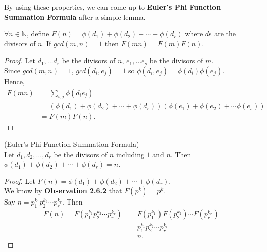 \noindent
By using these properties, we can come up to \textbf{Euler's Phi Function Summation Formula} after a simple lemma.

\begin{lemma}
$\forall n\in \mathbb{N}$, define $F(n) = \phi(d_{1}) + \phi(d_{2}) + \cdots + \phi(d_{r})$ where $d$s are the divisors of $n$. If $gcd(m, n) = 1$ then $F(mn) = F(m)F(n)$.
\end{lemma}

\begin{proof}
Let $d_{1},\dots d_{r}$ be the divisors of $n$, $e_{1},\dots e_{s}$ be the divisors of $m$. \\
Since $gcd(m, n) = 1$, $gcd(d_{i}, e_{j}) = 1$ so $\phi(d_{i}, e_{j}) = \phi(d_{i})\phi(e_{j})$. \\
Hence, 
\begin{align*}
  F(mn) &= \sum_{i, j} \phi(d_{i}e_{j}) \\
  &= (\phi(d_{1}) + \phi(d_{2}) + \cdots + \phi(d_{r}))(\phi(e_{1}) + \phi(e_{2}) + \cdots \phi(e_{s})) \\
  &= F(m)F(n).
\end{align*}
\end{proof}

\begin{theorem}
  (Euler's Phi Function Summation Formula) \\
  Let $d_{1}, d_{2},\dots, d_{r}$ be the divisors of $n$ including $1$ and $n$. Then $\phi(d_{1}) + \phi(d_{2}) + \cdots + \phi(d_{r}) = n$.
\end{theorem}

\begin{proof}
  Let $F(n) = \phi(d_{1}) + \phi(d_{2}) + \cdots + \phi(d_{r})$. \\
  We know by \textbf{Observation 2.6.2} that $F(p^{k}) = p^{k}$. \\
  Say $n = p_{1}^{k_{1}}p_{2}^{k_{2}}\cdots p_{r}^{k_{r}}$. Then 
  \begin{align*}
    F(n) = F(p_{1}^{k_{1}}p_{2}^{k_{2}}\cdots p_{r}^{k_{r}}) &= F(p_{1}^{k_{1}})F(p_{2}^{k_{2}})\cdots F(p_{r}^{k_{r}}) \\
    &= p_{1}^{k_{1}}p_{2}^{k_{2}}\cdots p_{r}^{k_{r}} \\
    &= n.
  \end{align*}
\end{proof}